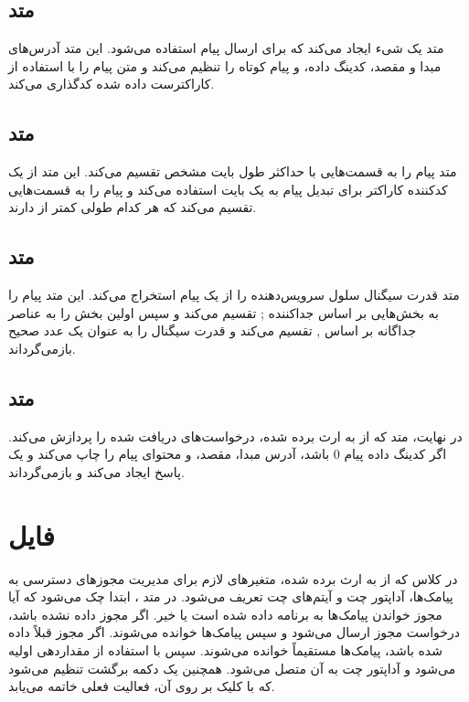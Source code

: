 \documentclass{report}
\begin{document}
 \subsection{متد
 }
متد
  یک شیء 
  ایجاد می‌کند که برای ارسال پیام
    استفاده می‌شود. این متد آدرس‌های مبدا و مقصد، کدینگ داده، و پیام کوتاه را تنظیم می‌کند و متن پیام را با استفاده از کاراکترست داده شده کدگذاری می‌کند.
\subsection{متد
}
متد
 پیام را به قسمت‌هایی با حداکثر طول بایت مشخص تقسیم می‌کند. این متد از یک کدکننده کاراکتر برای تبدیل پیام به یک
  بایت استفاده می‌کند و پیام را به قسمت‌هایی تقسیم می‌کند که هر کدام طولی کمتر از 
 دارند.
\subsection{متد
}
متد 
قدرت سیگنال سلول سرویس‌دهنده را از یک پیام استخراج می‌کند. این متد پیام را به بخش‌هایی بر اساس جداکننده ; تقسیم می‌کند و سپس اولین بخش را به عناصر جداگانه بر اساس , تقسیم می‌کند و قدرت سیگنال را به عنوان یک عدد صحیح بازمی‌گرداند.
\subsection{متد
}
در نهایت، متد 
 که از
   به ارث برده شده، درخواست‌های
     دریافت شده را پردازش می‌کند. اگر کدینگ داده پیام 0 باشد، آدرس مبدا، مقصد، و محتوای پیام را چاپ می‌کند و یک پاسخ ایجاد می‌کند و بازمی‌گرداند.


\section{فایل
}
در کلاس 
 که از
   به ارث برده شده، متغیرهای لازم برای مدیریت مجوزهای دسترسی به پیامک‌ها، آداپتور چت و آیتم‌های چت تعریف می‌شود. در متد
    ، ابتدا چک می‌شود که آیا مجوز خواندن پیامک‌ها به برنامه داده شده است یا خیر. اگر مجوز داده نشده باشد، درخواست مجوز ارسال می‌شود و سپس پیامک‌ها خوانده می‌شوند. اگر مجوز قبلاً داده شده باشد، پیامک‌ها مستقیماً خوانده می‌شوند. سپس
     با استفاده از
      مقداردهی اولیه می‌شود و آداپتور چت به آن متصل می‌شود. همچنین یک دکمه برگشت تنظیم می‌شود که با کلیک بر روی آن، فعالیت فعلی خاتمه می‌یابد.
\end{document}
